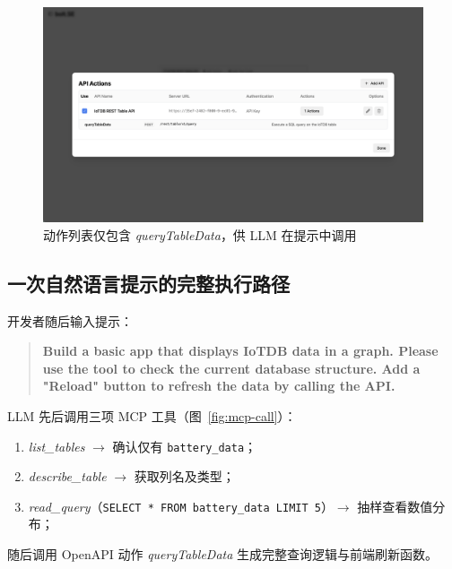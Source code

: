 \begin{figure}[htbp]
  \centering
  \includegraphics[width=.9\textwidth]{figures/screenshots/iotdb-demo/api-actions.png}
  \caption{动作列表仅包含 \textit{queryTableData}，供 LLM 在提示中调用}
  \label{fig:api-actions}
\end{figure}

\subsection{一次自然语言提示的完整执行路径}

开发者随后输入提示：

\begin{quote}
\small
\textbf{Build a basic app that displays IoTDB data in a graph. Please use the tool to check the current database structure. Add a "Reload" button to refresh the data by calling the API.}
\end{quote}

LLM 先后调用三项 MCP 工具（图~\ref{fig:mcp-call}）：

\begin{enumerate}
  \item \textit{list\_tables} $\rightarrow$ 确认仅有 \texttt{battery\_data}；
  \item \textit{describe\_table} $\rightarrow$ 获取列名及类型；
  \item \textit{read\_query}（\verb|SELECT * FROM battery_data LIMIT 5|）$\rightarrow$ 抽样查看数值分布；
\end{enumerate}

随后调用 OpenAPI 动作 \textit{queryTableData}
生成完整查询逻辑与前端刷新函数。

